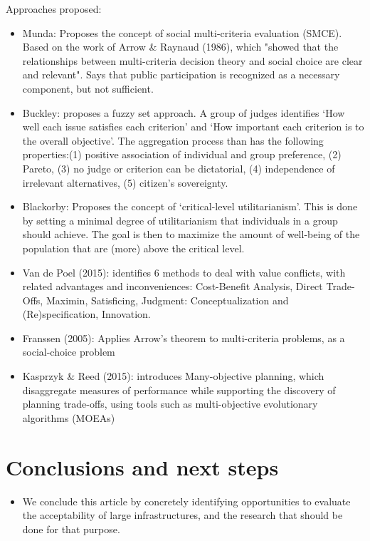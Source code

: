 \documentclass[a4paper,10pt]{article}
\begin{document}
\begin{multicols}{2}
\noindent Approaches proposed:	
\begin{itemize}
	\setlength\itemsep{-0.1em}
	\item Munda: Proposes the concept of social multi-criteria evaluation (SMCE). Based on the work of Arrow \& Raynaud (1986), which "showed that the relationships between multi-criteria decision theory and social choice are clear and relevant". Says that public participation is recognized as a necessary component, but not sufficient.
	\item Buckley: proposes a fuzzy set approach. A group of judges identifies `How well each issue satisfies each criterion' and `How important each criterion is to the overall objective'. The aggregation process than has the following properties:(1) positive association of individual and group preference, (2) Pareto, (3) no judge or criterion can be dictatorial, (4) independence of irrelevant alternatives, (5) citizen's sovereignty. 
	\item Blackorby: Proposes the concept of ‘critical-level utilitarianism'. This is done by setting a minimal degree of utilitarianism that individuals in a group should achieve. The goal is then to maximize the amount of well-being of the population that are (more) above the critical level.
	\item Van de Poel (2015): identifies 6 methods to deal with value conflicts, with related advantages and inconveniences: Cost-Benefit Analysis, Direct Trade-Offs, Maximin, Satisficing, Judgment: Conceptualization and (Re)specification, Innovation.
	\item Franssen (2005): Applies Arrow's theorem to multi-criteria problems, as a social-choice problem
	\item Kasprzyk \& Reed (2015): introduces Many-objective planning, which disaggregate measures of performance while supporting the discovery of planning trade-offs, using tools such as multi-objective evolutionary algorithms (MOEAs)
\end{itemize}
	
\section{Conclusions and next steps}
\label{Conclusions and next steps}

\begin{itemize}
	\item We conclude this article by concretely identifying opportunities to evaluate the acceptability of large infrastructures, and the research that should be done for that purpose.
\end{itemize}

\end{multicols}
\vspace{0.5 cm}
\begin{multicols}{2}






\end{multicols}
\end{document}
